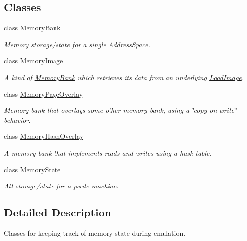 \subsection*{Classes}
\begin{DoxyCompactItemize}
\item 
class \mbox{\hyperlink{class_memory_bank}{Memory\+Bank}}
\begin{DoxyCompactList}\small\item\em Memory storage/state for a single Address\+Space. \end{DoxyCompactList}\item 
class \mbox{\hyperlink{class_memory_image}{Memory\+Image}}
\begin{DoxyCompactList}\small\item\em A kind of \mbox{\hyperlink{class_memory_bank}{Memory\+Bank}} which retrieves its data from an underlying \mbox{\hyperlink{class_load_image}{Load\+Image}}. \end{DoxyCompactList}\item 
class \mbox{\hyperlink{class_memory_page_overlay}{Memory\+Page\+Overlay}}
\begin{DoxyCompactList}\small\item\em Memory bank that overlays some other memory bank, using a \char`\"{}copy on write\char`\"{} behavior. \end{DoxyCompactList}\item 
class \mbox{\hyperlink{class_memory_hash_overlay}{Memory\+Hash\+Overlay}}
\begin{DoxyCompactList}\small\item\em A memory bank that implements reads and writes using a hash table. \end{DoxyCompactList}\item 
class \mbox{\hyperlink{class_memory_state}{Memory\+State}}
\begin{DoxyCompactList}\small\item\em All storage/state for a pcode machine. \end{DoxyCompactList}\end{DoxyCompactItemize}


\subsection{Detailed Description}
Classes for keeping track of memory state during emulation. 

